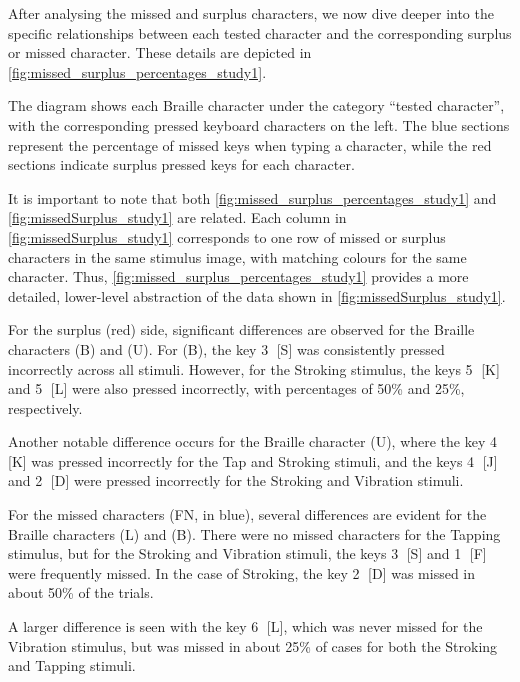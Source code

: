 After analysing the missed and surplus characters, we now dive deeper into the specific relationships between each tested character and the corresponding surplus or missed character. These details are depicted in \autoref{fig:missed_surplus_percentages_study1}.

The diagram shows each Braille character under the category \enquote{tested character}, with the corresponding pressed keyboard characters on the left. 
The blue sections represent the percentage of missed keys when typing a character, while the red sections indicate surplus pressed keys for each character.

It is important to note that both \autoref{fig:missed_surplus_percentages_study1} and \autoref{fig:missedSurplus_study1} are related. Each column in \autoref{fig:missedSurplus_study1} corresponds to one row of missed or surplus characters in the same stimulus image, with matching colours for the same character. 
Thus, \autoref{fig:missed_surplus_percentages_study1} provides a more detailed, lower-level abstraction of the data shown in \autoref{fig:missedSurplus_study1}.

For the surplus (red) side, significant differences are observed for the Braille characters (B) and (U). For (B), the key \textcircled{3} [S] was consistently pressed incorrectly across all stimuli. However, for the Stroking stimulus, the keys \textcircled{5} [K] and \textcircled{5} [L] were also pressed incorrectly, with percentages of 50\% and 25\%, respectively.

Another notable difference occurs for the Braille character (U), where the key \textcircled{4} [K] was pressed incorrectly for the Tap and Stroking stimuli, and the keys \textcircled{4} [J] and \textcircled{2} [D] were pressed incorrectly for the Stroking and Vibration stimuli.

For the missed characters (FN, in blue), several differences are evident for the Braille characters (L) and (B). There were no missed characters for the Tapping stimulus, but for the Stroking and Vibration stimuli, the keys \textcircled{3} [S] and \textcircled{1} [F] were frequently missed. In the case of Stroking, the key \textcircled{2} [D] was missed in about 50\% of the trials.

A larger difference is seen with the key \textcircled{6} [L], which was never missed for the Vibration stimulus, but was missed in about 25\% of cases for both the Stroking and Tapping stimuli.


